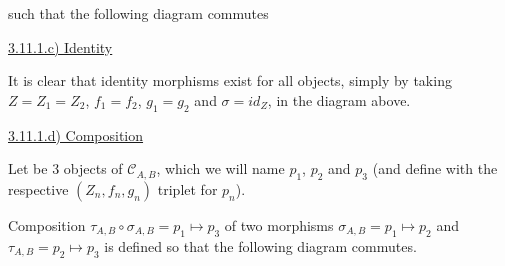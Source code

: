 \documentclass[12pt, letterpaper, twoside]{report}
\begin{document}
such that the following diagram commutes



\vspace{5mm}
\underline{3.11.1.c) Identity}

It is clear that identity morphisms exist for all objects, simply by taking $Z = Z_1 = Z_2$, $f_1 = f_2$, $g_1 = g_2$ and $\sigma = id_Z$, in the diagram above.


\vspace{5mm}
\underline{3.11.1.d) Composition}

Let be 3 objects of $\mathcal{C}_{A,B}$, which we will name $p_1$, $p_2$ and $p_3$ (and define with the respective $(Z_n, f_n, g_n)$ triplet for $p_n$).

Composition $\tau_{A, B} \circ \sigma_{A, B} = p_1 \mapsto p_3$ of two morphisms $\sigma_{A, B} = p_1 \mapsto p_2$ and $\tau_{A, B} = p_2 \mapsto p_3$ is defined so that the following diagram commutes.

\end{document}
